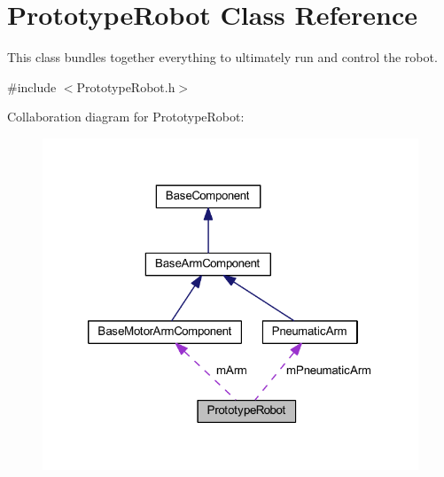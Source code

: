 \hypertarget{class_prototype_robot}{\section{\-Prototype\-Robot \-Class \-Reference}
\label{class_prototype_robot}
}


\-This class bundles together everything to ultimately run and control the robot.  




{\ttfamily \#include $<$\-Prototype\-Robot.\-h$>$}



\-Collaboration diagram for \-Prototype\-Robot\-:\nopagebreak
\begin{figure}[H]
\begin{center}
\leavevmode
\includegraphics[width=322pt]{class_prototype_robot__coll__graph}
\end{center}
\end{figure}
